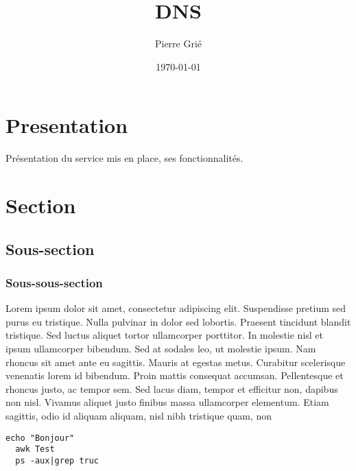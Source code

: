 \documentclass[10pt]{article}
\title{DNS}
\author{Pierre Gri\'e}
\date{\today}
\begin{document}
\begin{titlepage}
\maketitle
\end{titlepage}

\restoregeometry

\linespread{1.15} %

\section{Presentation}

Pr\'esentation du service mis en place, ses fonctionnalit\'es.


\section{Section}

\subsection{Sous-section}

\subsubsection{Sous-sous-section}

Lorem ipsum dolor sit amet, consectetur adipiscing elit. Suspendisse pretium sed purus eu tristique. Nulla pulvinar in dolor sed lobortis. Praesent tincidunt blandit tristique. Sed luctus aliquet tortor ullamcorper porttitor. In molestie nisl et ipsum ullamcorper bibendum. Sed at sodales leo, ut molestie ipsum. Nam rhoncus sit amet ante eu sagittis. Mauris at egestas metus. Curabitur scelerisque venenatis lorem id bibendum. Proin mattis consequat accumsan. Pellentesque et rhoncus justo, ac tempor sem. Sed lacus diam, tempor et efficitur non, dapibus non nisl. Vivamus aliquet justo finibus massa ullamcorper elementum. Etiam sagittis, odio id aliquam aliquam, nisl nibh tristique quam, non\\

\begin{lstlisting}[title=Test]
  echo "Bonjour"
  awk Test
  ps -aux|grep truc
\end{lstlisting}
\end{document}
